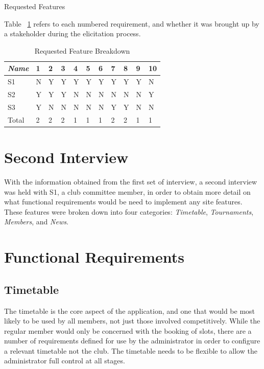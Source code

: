 \begin{table}[H]
\label{fig:requirementsFeatures}
\caption{Requested Features}
\end{table}
Table ~\ref{fig:reqbreakdown} refers to each numbered requirement, and whether it was brought up by a stakeholder during the elicitation process.
\begin{table}[H]
\caption{Requested Feature Breakdown}
\begin{center}
    \begin{tabular}{ | l | l | l | l| l| l| l| l| l|l| p{.22cm} |}
    \hline
     \textit{Name}& 1& 2 & 3 & 4 & 5 & 6 & 7 & 8 & 9 & 10\\ \hline
	 S1 & N & Y & Y & Y & Y & Y & Y & Y & Y & N\\ \hline
	 S2 & Y & Y & Y & N & N & N & N & N & N & Y\\ \hline
	 S3 & Y & N & N & N & N & N & Y & Y & N & N\\ \hline
  Total & 2 & 2 & 2 & 1 & 1 & 1 & 2 & 2 & 1 & 1\\ \hline
    \end{tabular}
\end{center}
\label{fig:reqbreakdown}
\end{table}

\section{Second Interview}

With the information obtained from the first set of interview, a second interview was held with S1, a club committee member, in order to obtain more detail on what functional requirements would be need to implement any site features. These features were broken down into four categories: \textit{Timetable}, \textit{Tournaments}, \textit{Members}, and \textit{News}.

\section{Functional Requirements}

\subsection{Timetable} 

The timetable is the core aspect of the application, and one that would be most likely to be used by all members, not just those involved competitively. While the regular member would only be concerned with the booking of slots, there are a number of requirements defined for use by the administrator in order to configure a relevant timetable not the club. The timetable needs to be flexible to allow the administrator full control at all stages.

